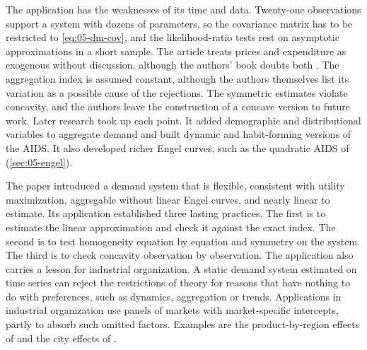 The application has the weaknesses of its time and data. Twenty-one observations support a system with
dozens of parameters, so the covariance matrix has to be restricted to \eqref{eq:05-dm-cov}, and the
likelihood-ratio tests rest on asymptotic approximations in a short sample. The article treats prices and
expenditure as exogenous without discussion, although the authors' book doubts both
\citep[\S 3.5, pp.~81--82]{DeatonMuellbauer1980b}. The aggregation index is assumed constant, although the authors
themselves list its variation as a possible cause of the rejections. The symmetric estimates violate
concavity, and the authors leave the construction of a concave version to future work. Later research
took up each point. It added demographic and distributional variables to aggregate demand and built
dynamic and habit-forming versions of the AIDS. It also developed richer Engel curves, such as the
quadratic AIDS of \citet{BanksBlundellLewbel1997} (\cref{sec:05-engel}).

The paper introduced a demand system that is flexible, consistent with utility maximization, aggregable
without linear Engel curves, and nearly linear to estimate. Its application established three lasting
practices. The first is to estimate the linear approximation and check it against the exact index. The
second is to test homogeneity equation by equation and symmetry on the system. The third is to check
concavity observation by observation. The application also carries a lesson for industrial organization. A static demand system
estimated on time series can reject the restrictions of theory for reasons that have nothing to do with
preferences, such as dynamics, aggregation or trends. Applications in industrial organization use panels
of markets with market-specific intercepts, partly to absorb such omitted factors. Examples are the
product-by-region effects of \citet{ChaudhuriGoldbergJia2006} and the city effects of \citet{Hausman1997}.

